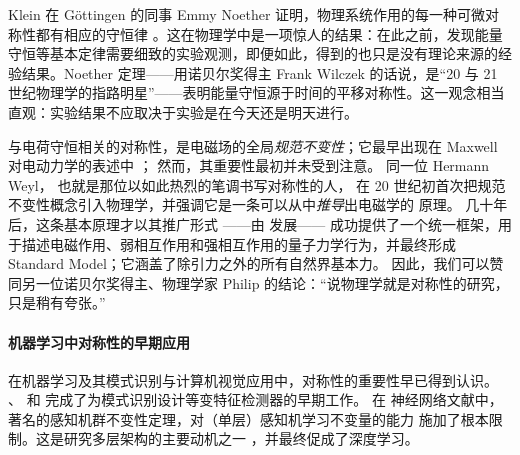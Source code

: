

Klein 在 G\"ottingen 的同事 Emmy Noether 证明，物理系统作用的每一种可微对称性都有相应的守恒律 \citep{variationsprobleme1918nachr}。这在物理学中是一项惊人的结果：在此之前，发现能量守恒等基本定律需要细致的实验观测，即便如此，得到的也只是没有理论来源的经验结果。Noether 定理——用诺贝尔奖得主 Frank Wilczek 的话说，是“20 与 21 世纪物理学的指路明星”——表明能量守恒源于时间的平移对称性。这一观念相当直观：实验结果不应取决于实验是在今天还是明天进行。



与电荷守恒相关的对称性，是电磁场的全局\emph{规范不变性}；它最早出现在 Maxwell 对电动力学的表述中 \citep{maxwell1865viii}；%
然而，其重要性最初并未受到注意。%
%
同一位 Hermann Weyl，
也就是那位以如此热烈的笔调书写对称性的人，%
在 20 世纪初首次把规范不变性概念引入物理学，并强调它是一条可以从中\emph{推导}出电磁学的
原理。
%
几十年后，这条基本原理才以其推广形式
——由 \cite{yang1954conservation} 发展——
成功提供了一个统一框架，用于描述电磁作用、弱相互作用和强相互作用的量子力学行为，并最终形成 Standard Model；它涵盖了除引力之外的所有自然界基本力。
%
因此，我们可以赞同另一位诺贝尔奖得主、物理学家 Philip \cite{anderson1972more} 的结论：“说物理学就是对称性的研究，只是稍有夸张。”






\paragraph{机器学习中对称性的早期应用}
在机器学习及其模式识别与计算机视觉应用中，对称性的重要性早已得到认识。
%
\citet{amari1978feature}、\citet{kanatani2012group} 和 \citet{lenz1990group} 完成了为模式识别设计等变特征检测器的早期工作。
%
在
神经网络文献中，\citet{minsky2017perceptrons} 著名的感知机群不变性定理，对（单层）感知机学习不变量的能力
施加了根本限制。这是研究多层架构的主要动机之一 \citep{sejnowski1986learning,shawe1989building,shawe1993symmetries}，并最终促成了深度学习。

